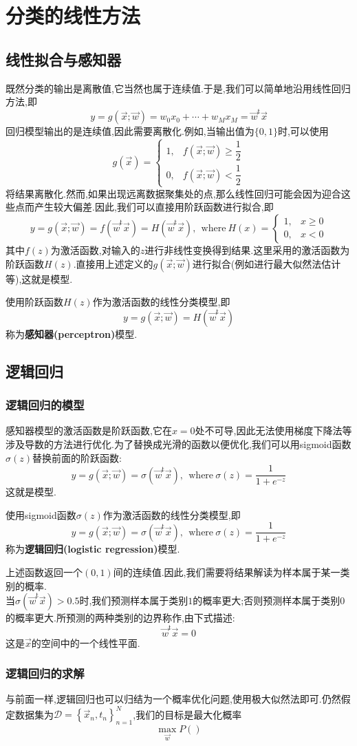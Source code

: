 \documentclass{ctexart}
\begin{document}
\setcounter{FormalCounter}{0}
\section{分类的线性方法}
\subsection{线性拟合与感知器}
既然分类的输出是离散值,它当然也属于连续值.于是,我们可以简单地沿用线性回归方法,即
\[y=g(\vec{x};\vec{w})=w_0x_0+\cdots+w_Mx_M=\vec{w}^{\text{t}}\vec{x}\]
回归模型输出的是连续值,因此需要离散化.例如,当输出值为$\{0,1\}$时,可以使用
\[g(\vec{x})=\begin{cases}
    1,&f(\vec{x};\vec{w})\geq \dfrac12\\
    0,&f(\vec{x};\vec{w})<\dfrac12
\end{cases}\]
将结果离散化.然而,如果出现远离数据聚集处的点,那么线性回归可能会因为迎合这些点而产生较大偏差.因此,我们可以直接用阶跃函数进行拟合,即
\[y=g(\vec{x};\vec{w})=f\left(\vec{w}^{\text{t}}\vec{x}\right)=H\left(\vec{w}^{\text{t}}\vec{x}\right),\ \ \text{where}\ H(x)=\begin{cases}
    1,&x\geq 0\\
    0,&x<0
\end{cases}\]
其中$f(z)$为激活函数,对输入的$z$进行非线性变换得到结果.这里采用的激活函数为阶跃函数$H(z)$.直接用上述定义的$g(\vec{x};\vec{w})$进行拟合(例如进行最大似然法估计等),这就是模型.
\begin{definition}[感知器]
    使用阶跃函数$H(z)$作为激活函数的线性分类模型,即
    \[y=g(\vec{x};\vec{w})=H\left(\vec{w}^{\text{t}}\vec{x}\right)\]
    称为\textbf{感知器(perceptron)}模型.
\end{definition}
\subsection{逻辑回归}
\subsubsection{逻辑回归的模型}
感知器模型的激活函数是阶跃函数,它在$x=0$处不可导,因此无法使用梯度下降法等涉及导数的方法进行优化.为了替换成光滑的函数以便优化,我们可以用sigmoid函数$\sigma(z)$替换前面的阶跃函数:
\[y=g\left(\vec{x};\vec{w}\right)=\sigma\left(\vec{w}^{\text{t}}\vec{x}\right),\ \ \text{where}\ \sigma(z)=\dfrac{1}{1+e^{-z}}\]
这就是模型.
\begin{definition}[逻辑回归]
    使用sigmoid函数$\sigma(z)$作为激活函数的线性分类模型,即
    \[y=g\left(\vec{x};\vec{w}\right)=\sigma\left(\vec{w}^{\text{t}}\vec{x}\right),\ \ \text{where}\ \sigma(z)=\dfrac{1}{1+e^{-z}}\]
    称为\textbf{逻辑回归(logistic regression)}模型.
\end{definition}
上述函数返回一个$(0,1)$间的连续值.因此,我们需要将结果解读为样本属于某一类别的概率.\\
\indent 当$\sigma\left(\vec{w}^{\text{t}}\vec{x}\right)>0.5$时,我们预测样本属于类别$1$的概率更大;否则预测样本属于类别$0$的概率更大.所预测的两种类别的边界称作,由下式描述:
\[\vec{w}^{\text{t}}\vec{x}=0\]
这是$\vec{x}$的空间中的一个线性平面.
\subsubsection{逻辑回归的求解}
与前面一样,逻辑回归也可以归结为一个概率优化问题,使用极大似然法即可.仍然假定数据集为$\mathcal{D}=\left\{\vec{x}_n,t_n\right\}_{n=1}^{N}$,我们的目标是最大化概率
\[\max_{\vec{w}}P\left(\right)\]
\end{document}
